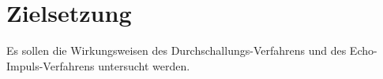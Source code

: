 
\section{Zielsetzung}
\label{sec:Zielsetzung}
Es sollen die Wirkungsweisen des Durchschallungs-Verfahrens und des Echo-Impuls-Verfahrens
untersucht werden.
